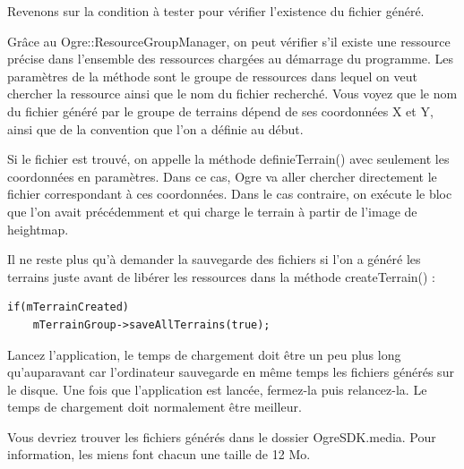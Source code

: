 Revenons sur la condition à tester pour vérifier l'existence du fichier généré.

Grâce au Ogre::ResourceGroupManager, on peut vérifier s'il existe une ressource précise dans l'ensemble des ressources chargées au démarrage du programme. Les paramètres de la méthode sont le groupe de ressources dans lequel on veut chercher la ressource ainsi que le nom du fichier recherché. Vous voyez que le nom du fichier généré par le groupe de terrains dépend de ses coordonnées X et Y, ainsi que de la convention que l'on a définie au début.

Si le fichier est trouvé, on appelle la méthode definieTerrain() avec seulement les coordonnées en paramètres. Dans ce cas, Ogre va aller chercher directement le fichier correspondant à ces coordonnées. Dans le cas contraire, on exécute le bloc que l'on avait précédemment et qui charge le terrain à partir de l'image de heightmap.

Il ne reste plus qu'à demander la sauvegarde des fichiers si l'on a généré les terrains juste avant de libérer les ressources dans la méthode createTerrain() :

\begin{lstlisting}[caption={}]
if(mTerrainCreated)
    mTerrainGroup->saveAllTerrains(true);
\end{lstlisting}


Lancez l'application, le temps de chargement doit être un peu plus long qu'auparavant car l'ordinateur sauvegarde en même temps les fichiers générés sur le disque. Une fois que l'application est lancée, fermez-la puis relancez-la. Le temps de chargement doit normalement être meilleur.

Vous devriez trouver les fichiers générés dans le dossier OgreSDK.media. Pour information, les miens font chacun une taille de 12 Mo.
























